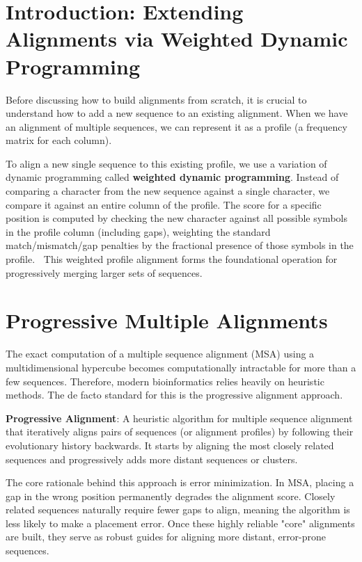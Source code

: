 \documentclass[11pt, a4paper]{article}
\newcommand{\sta}{\textbf{\sffamily [CRITICAL / EXAM]\ }}
\newenvironment{important}
  {\begin{tcolorbox}[colback=blue!5!white, colframe=blue!75!black, arc=1mm, boxrule=1pt]}
  {\end{tcolorbox}}
\begin{document}



\section{Introduction: Extending Alignments via Weighted Dynamic Programming}

Before discussing how to build alignments from scratch, it is crucial to understand how to add a new sequence to an existing alignment. When we have an alignment of multiple sequences, we can represent it as a profile (a frequency matrix for each column). 

To align a new single sequence to this existing profile, we use a variation of dynamic programming called \textbf{weighted dynamic programming}. Instead of comparing a character from the new sequence against a single character, we compare it against an entire column of the profile.
The score for a specific position is computed by checking the new character against all possible symbols in the profile column (including gaps), weighting the standard match/mismatch/gap penalties by the fractional presence of those symbols in the profile. 
\sta This weighted profile alignment forms the foundational operation for progressively merging larger sets of sequences.

\section{Progressive Multiple Alignments}

The exact computation of a multiple sequence alignment (MSA) using a multidimensional hypercube becomes computationally intractable for more than a few sequences. Therefore, modern bioinformatics relies heavily on heuristic methods. The de facto standard for this is the progressive alignment approach.

\begin{important}
  \textbf{Progressive Alignment}: A heuristic algorithm for multiple sequence alignment that iteratively aligns pairs of sequences (or alignment profiles) by following their evolutionary history backwards. It starts by aligning the most closely related sequences and progressively adds more distant sequences or clusters.
\end{important}

The core rationale behind this approach is error minimization. In MSA, placing a gap in the wrong position permanently degrades the alignment score. Closely related sequences naturally require fewer gaps to align, meaning the algorithm is less likely to make a placement error. Once these highly reliable "core" alignments are built, they serve as robust guides for aligning more distant, error-prone sequences.
\end{document}
